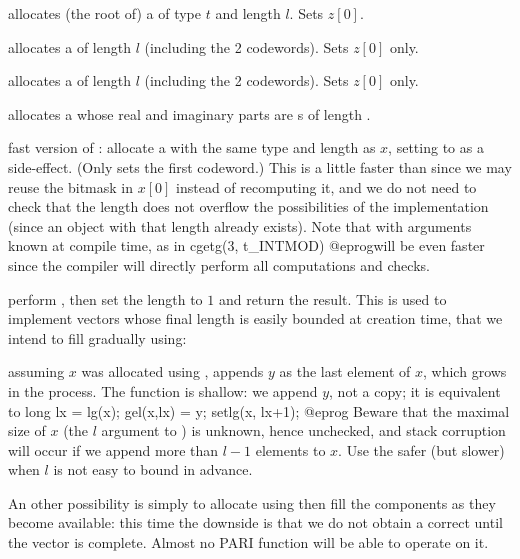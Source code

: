 
 allocates (the root of) a 
of type $t$ and length $l$. Sets $z[0]$.

 allocates a  of length $l$ (including the
2 codewords). Sets $z[0]$ only.

 allocates a  of length $l$ (including the
2 codewords). Sets $z[0]$ only.

 allocates a  whose real and
imaginary parts are s of length .

 fast version of :
allocate a  with the same type and length as $x$, setting 
to  as a side-effect. (Only sets the first codeword.) This is
a little faster than  since we may reuse the bitmask in
$x[0]$ instead of recomputing it, and we do not need to check that the
length does not overflow the possibilities of the
implementation (since an object with that length already exists). Note that
 with arguments known at compile time, as in
\bprog
  cgetg(3, t_INTMOD)
@eprog\noindent will be even faster since the compiler will directly perform
all computations and checks.

 perform , then
set the length to $1$ and return the result. This is used to  implement
vectors whose final length is easily bounded at creation time, that we intend
to fill gradually using:

 assuming $x$ was allocated using
, appends $y$ as the last element of $x$, which
grows in the process. The function is shallow: we append $y$, not a copy;
it is equivalent to
\bprog
  long lx = lg(x); gel(x,lx) = y; setlg(x, lx+1);
@eprog\noindent
Beware that the maximal size of $x$ (the $l$ argument to )
is unknown, hence unchecked, and stack corruption will occur if we append
more than $l-1$ elements to $x$. Use the safer (but slower)
 when $l$ is not easy to bound in advance.

An other possibility is simply to allocate using  then fill
the components as they become available: this time the downside is that we do
not obtain a correct  until the vector is complete. Almost no PARI
function will be able to operate on it.

